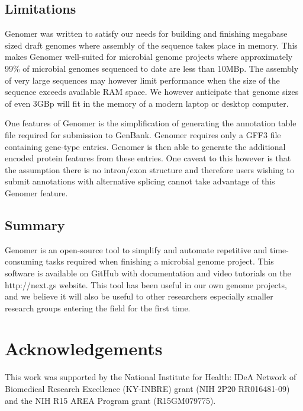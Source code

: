 \documentclass[10pt]{article}
\begin{document}
\subsection*{Limitations}

Genomer was written to satisfy our needs for building and finishing megabase
sized draft genomes where assembly of the sequence takes place in memory. This
makes Genomer well-suited for microbial genome projects where approximately
99\% of microbial genomes sequenced to date are less than 10MBp. The assembly
of very large sequences may however limit performance when the size of the
sequence exceeds available RAM space. We however anticipate that genome sizes
of even 3GBp will fit in the memory of a modern laptop or desktop computer.

One features of Genomer is the simplification of generating the annotation
table file required for submission to GenBank. Genomer requires only a GFF3
file containing gene-type entries. Genomer is then able to generate the
additional encoded protein features from these entries. One caveat to this
however is that the assumption there is no intron/exon structure and therefore
users wishing to submit annotations with alternative splicing cannot take
advantage of this Genomer feature.

\subsection*{Summary}

Genomer is an open-source tool to simplify and automate repetitive and
time-consuming tasks required when finishing a microbial genome project. This
software is available on GitHub \cite{genomer-github} with documentation and
video tutorials on the http://next.gs website. This tool has been useful in our
own genome projects, and we believe it will also be useful to other researchers
especially smaller research groups entering the field for the first time.

\section*{Acknowledgements}

This work was supported by the National Institute for Health: IDeA Network of
Biomedical Research Excellence (KY-INBRE) grant (NIH 2P20 RR016481-09) and the
NIH R15 AREA Program grant (R15GM079775).


\end{document}
